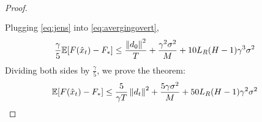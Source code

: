 \begin{proof}
\begin{align}
\begin{split}
        \end{split}
    \end{align}
    Plugging \eqref{eq:jens} into \eqref{eq:avergingovert},
    \begin{align}
        \begin{split}
            \frac{\gamma}{5} \mathbb{E} [F(\hat{x}_t) - F_*]
            &\leq \frac{\left\|d_0\right\|^2}{T}
            + \frac{\gamma^2 \sigma^2}{M}
            + 10 L_R (H-1) \gamma^3 \sigma^2
        \end{split}
    \end{align}
    Dividing both sides by $\frac{\gamma}{5}$, we prove the theorem:
    \begin{align}
        \begin{split}
            \mathbb{E} [F(\hat{x}_t) - F_*]
            &\leq \frac{5}{ \gamma T} \left\|d_t\right\|^2
            + \frac{5 \gamma \sigma^2}{M}
            + 50 L_R (H-1) \gamma^2 \sigma^2
        \end{split}
    \end{align}
\end{proof}
